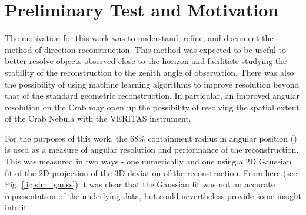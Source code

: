 \documentclass[main.tex]{subfiles}
\begin{document}
\section{Preliminary Test and Motivation}
The motivation for this work was to understand, refine, and document the \disp method of direction reconstruction. This method was expected to be useful to better resolve objects observed close to the horizon and facilitate studying the stability of the reconstruction to the zenith angle of observation. There was also the possibility of using machine learning algorithms to improve resolution beyond that of the standard geometric reconstruction. In particular, an improved angular resolution on the Crab may open up the possibility of resolving the spatial extent of the Crab Nebula with the VERITAS instrument.

For the purposes of this work, the 68\% containment radius in angular position (\rse\hspace{-4pt}) is used as a measure of angular resolution and performance of the reconstruction. This was measured in two ways - one numerically and one using a 2D Gaussian fit of the 2D projection of the 3D deviation of the reconstruction. From here (see Fig. \ref{fig:sim_gauss}) it was clear that the Gaussian fit was not an accurate representation of the underlying data, but could nevertheless provide some insight into it.
\end{document}
